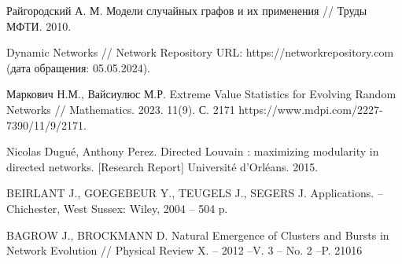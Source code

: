 \documentclass[a4paper,12pt]{article}
\begin{document}
\begin{thebibliography}{0}
 Райгородский А. М. Модели случайных графов и их применения // Труды МФТИ. 2010.

 Dynamic Networks // Network Repository URL: https://networkrepository.com (дата обращения: 05.05.2024).

 Маркович Н.М., Вайсиулюс М.Р. Extreme Value Statistics for Evolving Random Networks // Mathematics. 2023. 11(9). С. 2171 https://www.mdpi.com/2227-7390/11/9/2171.

 Nicolas Dugué, Anthony Perez. Directed Louvain : maximizing modularity in directed networks. [Research Report] Université d'Orléans. 2015.

 BEIRLANT J., GOEGEBEUR Y., TEUGELS J., SEGERS J. Applications. – Chichester, West Sussex: Wiley, 2004 – 504 p.

 BAGROW J., BROCKMANN D. Natural Emergence of Clusters and Bursts in Network Evolution // Physical Review X. – 2012 –V. 3 – No. 2 –P. 21016



\end{thebibliography}
\end{document}
